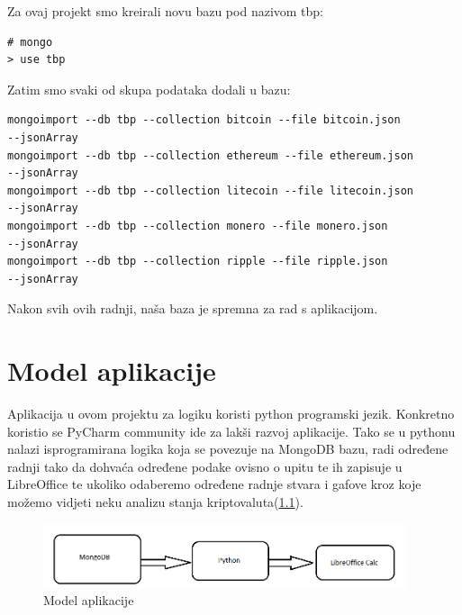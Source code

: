 \documentclass[a4paper,12pt]{foi}
\begin{document}
Za ovaj projekt smo kreirali novu bazu pod nazivom tbp:
\lstset{commentstyle=\textit,language=python}
\begin{lstlisting}[frame=tb]
# mongo
> use tbp
\end{lstlisting}
Zatim smo svaki od skupa podataka dodali u bazu:
\lstset{commentstyle=\textit,language=python}
\begin{lstlisting}[frame=tb]
mongoimport --db tbp --collection bitcoin --file bitcoin.json 
--jsonArray
mongoimport --db tbp --collection ethereum --file ethereum.json 
--jsonArray
mongoimport --db tbp --collection litecoin --file litecoin.json 
--jsonArray
mongoimport --db tbp --collection monero --file monero.json 
--jsonArray
mongoimport --db tbp --collection ripple --file ripple.json 
--jsonArray
\end{lstlisting}

Nakon svih ovih radnji, naša baza je spremna za rad s aplikacijom.

\chapter{Model aplikacije}
Aplikacija u ovom projektu za logiku koristi python programski jezik. Konkretno koristio se PyCharm community ide za lakši razvoj aplikacije. Tako se u pythonu nalazi isprogramirana logika koja se povezuje na MongoDB bazu, radi određene radnji tako da dohvaća određene podake ovisno o upitu te ih zapisuje u LibreOffice te ukoliko odaberemo određene radnje stvara i gafove kroz koje možemo vidjeti neku analizu stanja kriptovaluta(\ref{slika-3}).

\begin{figure}[h]
\centering 
\includegraphics[width=0.95\textwidth]{dizajn.png}
\caption{Model aplikacije}
\label{slika-3}
\end{figure}
\end{document}
